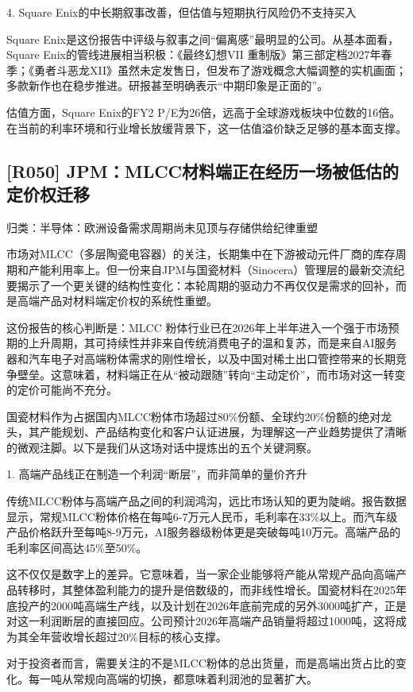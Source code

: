 \documentclass[11pt]{ctexart}
\begin{document}
4. Square Enix的中长期叙事改善，但估值与短期执行风险仍不支持买入

Square Enix是这份报告中评级与叙事之间“偏离感”最明显的公司。从基本面看，Square Enix的管线进展相当积极：《最终幻想VII 重制版》第三部定档2027年春季；《勇者斗恶龙XII》虽然未定发售日，但发布了游戏概念大幅调整的实机画面；多款新作也在稳步推进。研报甚至明确表示“中期印象是正面的”。

估值方面，Square Enix的FY2 P/E为26倍，远高于全球游戏板块中位数的16倍。在当前的利率环境和行业增长放缓背景下，这一估值溢价缺乏足够的基本面支撑。

\subsection{[R050] JPM：MLCC材料端正在经历一场被低估的定价权迁移}
{\small\color{refgray}归类：半导体：欧洲设备需求周期尚未见顶与存储供给纪律重塑}

市场对MLCC（多层陶瓷电容器）的关注，长期集中在下游被动元件厂商的库存周期和产能利用率上。但一份来自JPM与国瓷材料（Sinocera）管理层的最新交流纪要揭示了一个更关键的结构性变化：本轮周期的驱动力不再仅仅是需求的回补，而是高端产品对材料端定价权的系统性重塑。

这份报告的核心判断是：MLCC 粉体行业已在2026年上半年进入一个强于市场预期的上升周期，其可持续性并非来自传统消费电子的温和复苏，而是来自AI服务器和汽车电子对高端粉体需求的刚性增长，以及中国对稀土出口管控带来的长期竞争壁垒。这意味着，材料端正在从“被动跟随”转向“主动定价”，而市场对这一转变的定价可能尚不充分。

国瓷材料作为占据国内MLCC粉体市场超过80\%份额、全球约20\%份额的绝对龙头，其产能规划、产品结构变化和客户认证进展，为理解这一产业趋势提供了清晰的微观注脚。以下是我们从这场对话中提炼出的五个关键洞察。

1. 高端产品线正在制造一个利润“断层”，而非简单的量价齐升

传统MLCC粉体与高端产品之间的利润鸿沟，远比市场认知的更为陡峭。报告数据显示，常规MLCC粉体价格在每吨6-7万元人民币，毛利率在33\%以上。而汽车级产品价格跃升至每吨8-9万元，AI服务器级粉体更是突破每吨10万元。高端产品的毛利率区间高达45\%至50\%。

这不仅仅是数字上的差异。它意味着，当一家企业能够将产能从常规产品向高端产品转移时，其整体盈利能力的提升是倍数级的，而非线性增长。国瓷材料在2025年底投产的2000吨高端生产线，以及计划在2026年底前完成的另外3000吨扩产，正是对这一利润断层的直接回应。公司预计2026年高端产品销量将超过1000吨，这将成为其全年营收增长超过20\%目标的核心支撑。

对于投资者而言，需要关注的不是MLCC粉体的总出货量，而是高端出货占比的变化。每一吨从常规向高端的切换，都意味着利润池的显著扩大。
\end{document}

